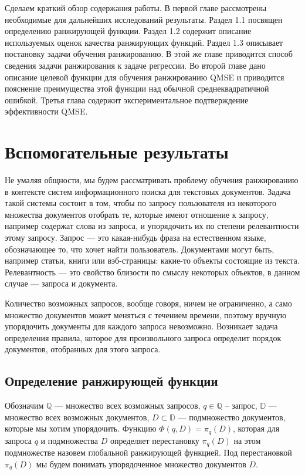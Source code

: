 \documentclass[specialist,
               substylefile = spbu.rtx,
               subf,href,colorlinks=true, 12pt]{disser}
\begin{document}
Сделаем краткий обзор содержания работы. В первой главе рассмотрены необходимые для дальнейших исследований результаты. Раздел 1.1 посвящен определению ранжирующей функции. Раздел 1.2 содержит описание используемых оценок качества ранжирующих функций. Раздел 1.3 описывает постановку задачи обучения ранжированию. В этой же главе приводится способ сведения задачи ранжирования к задаче регрессии. Во второй главе дано описание целевой функции для обучения ранжированию QMSE и приводится пояснение преимущества этой функции над обычной среднеквадратичной ошибкой. Третья глава содержит экспериментальное подтверждение эффективности QMSE.   

\chapter{Вспомогательные результаты}

Не умаляя общности, мы будем рассматривать проблему обучения ранжированию в контексте систем информационного поиска для текстовых документов. Задача такой системы состоит в том, чтобы по запросу пользователя из некоторого множества документов отобрать те, которые имеют отношение к запросу, например содержат слова из запроса, и упорядочить их по степени релевантности этому запросу. Запрос --- это какая-нибудь фраза на естественном языке, обозначающее то, что хочет найти пользователь. Документами могут быть, например статьи, книги или вэб-страницы: какие-то объекты состоящие из текста. Релевантность --- это свойство близости по смыслу некоторых объектов, в данном случае --- запроса и документа.\par

Количество возможных запросов, вообще говоря, ничем не ограниченно, а само множество документов может меняться с течением времени, поэтому вручную упорядочить документы для каждого запроса невозможно. Возникает задача определения правила, которое для произвольного запроса определит порядок документов, отобранных для этого запроса.\par

\section{Определение ранжирующей функции}

Обозначим $\mathbb Q$ --- множество всех возможных запросов, $q \in \mathbb Q$ --  запрос, $\mathbb D$ ---  множество всех возможных документов, $D \subset \mathbb D$ --- подмножество документов, которые мы хотим упорядочить. Функцию ${\Phi(q, D)= \pi_q(D)}$, которая для запроса  $q$ и подмножества  $D$  определяет перестановку $\pi_q(D)$  на этом подмножестве назовем глобальной ранжирующей функцией. Под перестановкой $\pi_q(D)$ мы будем понимать упорядоченное множество документов $D$.\par
\end{document}
